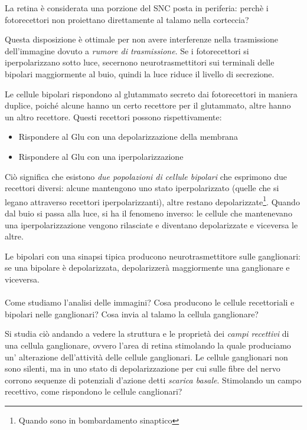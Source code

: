 \documentclass[a4paper,12pt]{article}
\begin{document}
La retina è considerata una porzione del SNC posta in periferia: perchè i fotorecettori non proiettano direttamente al talamo nella corteccia? 

Questa disposizione è ottimale per non avere interferenze nella trasmissione dell'immagine dovuto a \emph{rumore di trasmissione}. Se i fotorecettori si iperpolarizzano sotto luce, secernono neurotrasmettitori sui terminali delle bipolari maggiormente al buio, quindi la luce riduce il livello di secrezione.

Le cellule bipolari rispondono al glutammato secreto dai fotorecettori in maniera duplice, poiché alcune hanno un certo recettore per il glutammato, altre hanno un altro recettore. Questi recettori possono rispettivamente:

\begin{itemize}
\item{Rispondere al Glu con una depolarizzazione della membrana}
\item{Rispondere al Glu con una iperpolarizzazione}
\end{itemize}

Ciò significa che esistono \emph{due popolazioni di cellule bipolari} che esprimono due recettori diversi: alcune mantengono uno stato iperpolarizzato (quelle che si legano attraverso recettori iperpolarizzanti), altre restano depolarizzate\footnote{Quando sono in bombardamento sinaptico}. Quando dal buio si passa alla luce, si ha il fenomeno inverso: le cellule che mantenevano una iperpolarizzazione vengono rilasciate e diventano depolarizzate e viceversa le altre.

Le bipolari con una sinapsi tipica producono neurotrasmettitore sulle ganglionari: se una bipolare è depolarizzata, depolarizzerà maggiormente una ganglionare e viceversa.
\paragraph{}
Come studiamo l'analisi delle immagini? Cosa producono le cellule recettoriali e bipolari nelle ganglionari? Cosa invia al talamo la cellula ganglionare?

Si studia ciò andando a vedere la struttura e le proprietà dei \emph{campi recettivi} di una cellula ganglionare, ovvero l'area di retina stimolando la quale produciamo un' alterazione dell'attività delle cellule ganglionari. Le cellule ganglionari non sono silenti, ma in uno stato di depolarizzazione per cui sulle fibre del nervo corrono sequenze di potenziali d'azione detti \emph{scarica basale}. Stimolando un campo recettivo, come rispondono le cellule canglionari?
\end{document}
